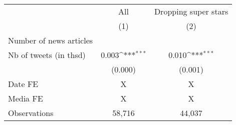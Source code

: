 {
\def\sym#1{\ifmmode^{#1}\else\(^{#1}\)\fi}
\begin{tabular}{l*{2}{c}}
\hline\hline
                    &\multicolumn{1}{c}{All}&\multicolumn{1}{c}{Dropping super stars}\\\cmidrule(lr){2-2}\cmidrule(lr){3-3}
                    &\multicolumn{1}{c}{(1)}         &\multicolumn{1}{c}{(2)}         \\
\hline
Number of news articles&                     &                     \\
Nb of tweets (in thsd)&       0.003\sym{***}&       0.010\sym{***}\\
                    &     (0.000)         &     (0.001)         \\
\hline
Date FE             &           X         &           X         \\
Media FE            &           X         &           X         \\
Observations        &      58,716         &      44,037         \\
\hline\hline
\end{tabular}
}
